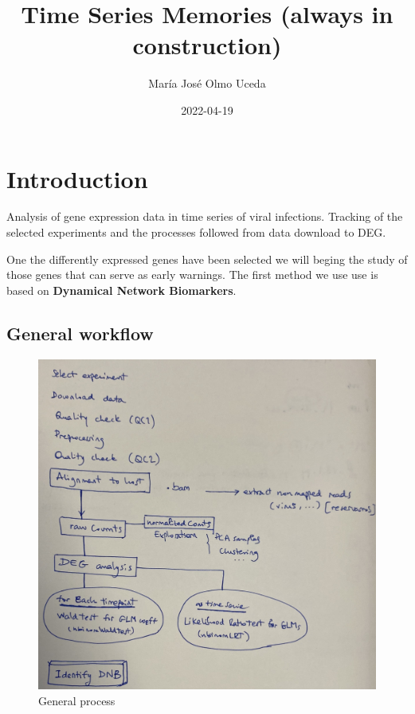 \documentclass[
]{book}
\title{Time Series Memories (always in construction)}
\author{María José Olmo Uceda}
\date{2022-04-19}
\begin{document}
\maketitle

{
\setcounter{tocdepth}{1}
\tableofcontents
}
\hypertarget{introduction}{%
\chapter{Introduction}\label{introduction}}

Analysis of gene expression data in time series of viral infections. Tracking of the selected experiments and the processes followed from data download to DEG.

One the differently expressed genes have been selected we will beging the study of those genes that can serve as early warnings. The first method we use use is based on \textbf{Dynamical Network Biomarkers}.

\hypertarget{general-workflow}{%
\section{General workflow}\label{general-workflow}}

\begin{figure}
\centering
\includegraphics{images/general_workflow.jpg}
\caption{General process}
\end{figure}
\end{document}
